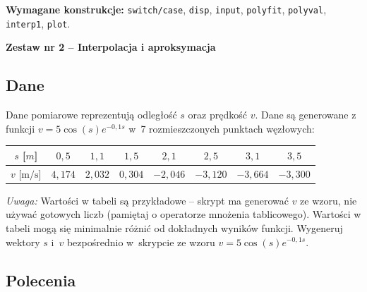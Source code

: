 \documentclass[a4paper,11pt]{article}
\begin{document}
\vspace{0.3cm}
\begin{ramka}
\textbf{Wymagane konstrukcje:}
\texttt{switch/case}, \texttt{disp}, \texttt{input}, \texttt{polyfit}, \texttt{polyval}, \texttt{interp1}, \texttt{plot}.
\end{ramka}

\clearpage
\begin{center}
  {\large\bfseries Zestaw nr 2 \quad -- \quad Interpolacja i aproksymacja}
\end{center}
\hrulefill
\vspace{0.4cm}

\subsection*{Dane}

Dane pomiarowe reprezentują odległość $s$ oraz prędkość $v$.
Dane są generowane z funkcji $v = 5\cos(s)e^{-0{,}1s}$ w~7 rozmieszczonych punktach węzłowych:

\begin{center}
\begin{tabular}{c|ccccccc}
  \toprule
  $s$ [$m$] & $0{,}5$ & $1{,}1$ & $1{,}5$ & $2{,}1$ & $2{,}5$ & $3{,}1$ & $3{,}5$ \\
  \midrule
  $v$ [$\text{m/s}$] & $4{,}174$ & $2{,}032$ & $0{,}304$ & $-2{,}046$ & $-3{,}120$ & $-3{,}664$ & $-3{,}300$ \\
  \bottomrule
\end{tabular}
\end{center}

\medskip
\textit{Uwaga:} Wartości w tabeli są przykładowe – skrypt ma generować $v$ ze wzoru, nie używać gotowych liczb (pamiętaj o operatorze mnożenia tablicowego). Wartości w tabeli mogą się minimalnie różnić od dokładnych wyników funkcji.
Wygeneruj wektory $s$ i~$v$ bezpośrednio w~skrypcie ze wzoru $v = 5\cos(s)e^{-0{,}1s}$.

\subsection*{Polecenia}
\end{document}
